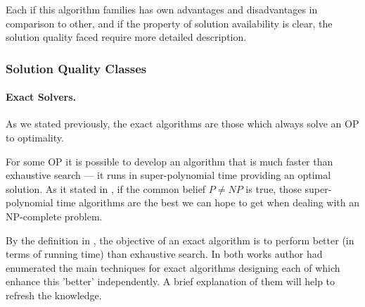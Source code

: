 Each if this algorithm families has own advantages and disadvantages in comparison to other, and if the property of solution availability is clear, the solution quality faced require more detailed description.

\subsubsection{Solution Quality Classes}
\paragraph{Exact Solvers.}
As we stated previously, the exact algorithms are those which always solve an OP to optimality.

For some OP it is possible to develop an algorithm that is much faster than exhaustive search — it runs in super-polynomial time providing an optimal solution. As it stated in \cite{woeginger2003exact}, if the common belief $P \ne NP$ is true, those super-polynomial time algorithms are the best we can hope to get when dealing with an NP-complete problem.

By the definition in \cite{fomin2013exact}, the objective of an exact algorithm is to perform better (in terms of running time) than exhaustive search.
In both works \cite{woeginger2003exact} author had enumerated the main techniques for exact algorithms designing each of which enhance this 'better' independently.
A brief explanation of them will help to refresh the knowledge.

